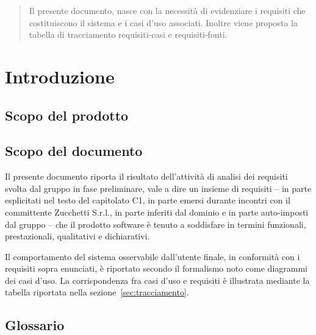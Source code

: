 \newpage



\setcounter{page}{1}
\pagestyle{normal}


\begin{abstract}
Il presente documento, nasce con la necessità di evidenziare i requisiti che costituiscono il sistema e i casi d'uso associati. Inoltre viene proposta la tabella di tracciamento requisiti-casi e requisiti-fonti.
\end{abstract}

\newpage

\section{Introduzione}
\subsection{Scopo del prodotto}
\purpose

\subsection{Scopo del documento}
Il presente documento riporta il risultato dell'attività di analisi dei requisiti svolta dal gruppo \team{} in fase preliminare, vale a dire un insieme di requisiti -- in parte esplicitati nel testo del capitolato C1, in parte emersi durante incontri con il committente Zucchetti S.r.l., in parte inferiti dal dominio e in parte auto-imposti dal gruppo -- che il prodotto software è tenuto a soddisfare in termini funzionali, prestazionali, qualitativi e dichiarativi.

Il comportamento del sistema osservabile dall'utente finale, in conformità con i requisiti sopra enunciati, è riportato secondo il formalismo noto come diagrammi dei casi d'uso. La corrispondenza fra casi d'uso e requisiti è illustrata mediante la tabella riportata nella sezione~\ref{sec:tracciamento}.

\subsection{Glossario}
\glossaryIntro

\clearpage
